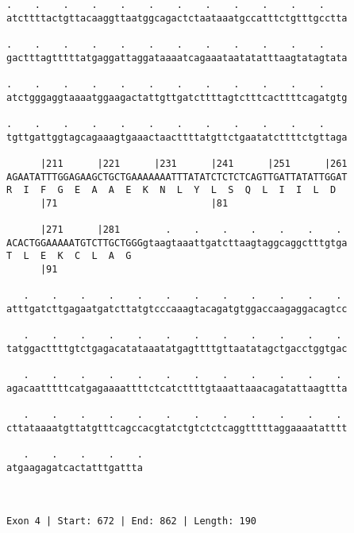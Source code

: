 \documentclass{article}
\begin{document}
\begin{Verbatim}
.    .    .    .    .    .    .    .    .    .    .    .    
atcttttactgttacaaggttaatggcagactctaataaatgccatttctgtttgcctta
                                                            
.    .    .    .    .    .    .    .    .    .    .    .    
gactttagtttttatgaggattaggataaaatcagaaataatatatttaagtatagtata
                                                            
.    .    .    .    .    .    .    .    .    .    .    .    
atctgggaggtaaaatggaagactattgttgatcttttagtctttcacttttcagatgtg
                                                            
.    .    .    .    .    .    .    .    .    .    .    .    
tgttgattggtagcagaaagtgaaactaacttttatgttctgaatatcttttctgttaga
                                                            
      |211      |221      |231      |241      |251      |261
AGAATATTTGGAGAAGCTGCTGAAAAAAATTTATATCTCTCTCAGTTGATTATATTGGAT
R  I  F  G  E  A  A  E  K  N  L  Y  L  S  Q  L  I  I  L  D  
      |71                           |81                     
  
      |271      |281        .    .    .    .    .    .    . 
ACACTGGAAAAATGTCTTGCTGGGgtaagtaaattgatcttaagtaggcaggctttgtga
T  L  E  K  C  L  A  G                                      
      |91                                                   
  
   .    .    .    .    .    .    .    .    .    .    .    . 
atttgatcttgagaatgatcttatgtcccaaagtacagatgtggaccaagaggacagtcc
                                                            
   .    .    .    .    .    .    .    .    .    .    .    . 
tatggacttttgtctgagacatataaatatgagttttgttaatatagctgacctggtgac
                                                            
   .    .    .    .    .    .    .    .    .    .    .    . 
agacaatttttcatgagaaaattttctcatcttttgtaaattaaacagatattaagttta
                                                            
   .    .    .    .    .    .    .    .    .    .    .    . 
cttataaaatgttatgtttcagccacgtatctgtctctcaggtttttaggaaaatatttt
                                                            
   .    .    .    .    .
atgaagagatcactatttgattta
                        
                        
 
Exon 4 | Start: 672 | End: 862 | Length: 190




\end{Verbatim}
\end{document}
